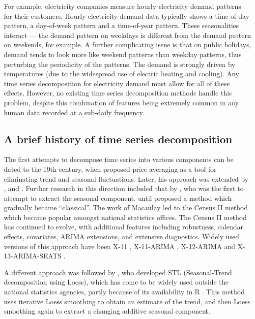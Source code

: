 \documentclass[ijds,nonblindrev]{informs-ijds}
\begin{document}
For example, electricity companies measure hourly electricity demand patterns for their customers. Hourly electricity demand data typically shows a time-of-day pattern, a day-of-week pattern and a time-of-year pattern. These seasonalities interact --- the demand pattern on weekdays is different from the demand pattern on weekends, for example. A further complicating issue is that on public holidays, demand tends to look more like weekend patterns than weekday patterns, thus perturbing the periodicity of the patterns. The demand is strongly driven by temperatures (due to the widespread use of electric heating and cooling). Any time series decomposition for electricity demand must allow for all of these effects. However, no existing time series decomposition methods handle this problem, despite this combination of features being extremely common in any human data recorded at a sub-daily frequency.

\hypertarget{a-brief-history-of-time-series-decomposition}{%
\subsection{A brief history of time series decomposition}\label{a-brief-history-of-time-series-decomposition}}

The first attempts to decompose time series into various components can be dated to the 19th century, when \citet{Poynting1884} proposed price averaging as a tool for eliminating trend and seasonal fluctuations. Later, his approach was extended by \citet{hooker1901suspension}, \citet{spencer1904graduation} and \citet{anderson1914nochmals}. Further research in this direction included that by \citet{copeland1915statistical}, who was the first to attempt to extract the seasonal component, until \citet{macaulay1930smooth} proposed a method which gradually became ``classical''. The work of Macaulay led to the Census II method \citep{shiskin1957electronic} which became popular amongst national statistics offices. The Census II method has continued to evolve, with additional features including robustness, calendar effects, covariates, ARIMA extensions, and extensive diagnostics. Widely used versions of this approach have been X-11 \citep{shishkin1967x}, X-11-ARIMA \citep{dagum1988x11arima,ladiray2001seasonal}, X-12-ARIMA \citep{findley1998new} and X-13-ARIMA-SEATS \citep{findley2005some}.

A different approach was followed by \citet{cleveland1990stl}, who developed STL (Seasonal-Trend decomposition using Loess), which has come to be widely used outside the national statistics agencies, partly because of its availability in R \citep{R}. This method uses iterative Loess smoothing to obtain an estimate of the trend, and then Loess smoothing again to extract a changing additive seasonal component.
\end{document}
